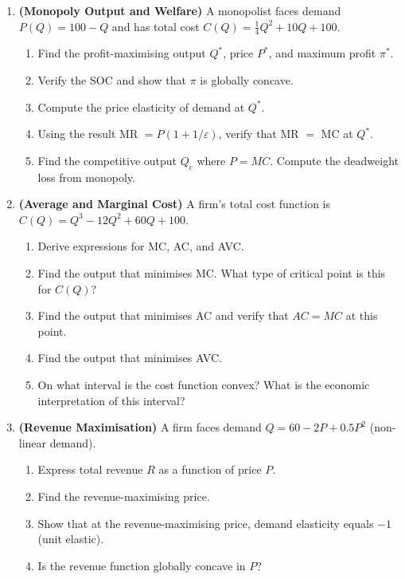 \documentclass[12pt, a4paper]{article}
\theoremstyle{definition}
\begin{document}
\begin{enumerate}[label=\textbf{B\arabic*.}, leftmargin=2.5em]

\item \textbf{(Monopoly Output and Welfare)}
A monopolist faces demand $P(Q) = 100 - Q$ and has total cost
$C(Q) = \frac{1}{4}Q^2 + 10Q + 100$.
\begin{enumerate}[label=(\alph*)]
  \item Find the profit-maximising output $Q^*$, price $P^*$, and
        maximum profit $\pi^*$.
  \item Verify the SOC and show that $\pi$ is globally concave.
  \item Compute the price elasticity of demand at $Q^*$.
  \item Using the result MR $= P(1+1/\varepsilon)$, verify that
        MR $=$ MC at $Q^*$.
  \item Find the competitive output $Q_c$ where $P = MC$.
        Compute the deadweight loss from monopoly.
\end{enumerate}

\item \textbf{(Average and Marginal Cost)}
A firm's total cost function is $C(Q) = Q^3 - 12Q^2 + 60Q + 100$.
\begin{enumerate}[label=(\alph*)]
  \item Derive expressions for MC, AC, and AVC.
  \item Find the output that minimises MC.  What type of critical point
        is this for $C(Q)$?
  \item Find the output that minimises AC and verify that $AC = MC$ at
        this point.
  \item Find the output that minimises AVC.
  \item On what interval is the cost function convex?  What is the
        economic interpretation of this interval?
\end{enumerate}

\item \textbf{(Revenue Maximisation)}
A firm faces demand $Q = 60 - 2P + 0.5P^2$ (non-linear demand).
\begin{enumerate}[label=(\alph*)]
  \item Express total revenue $R$ as a function of price $P$.
  \item Find the revenue-maximising price.
  \item Show that at the revenue-maximising price, demand elasticity
        equals $-1$ (unit elastic).
  \item Is the revenue function globally concave in $P$?
\end{enumerate}


\end{enumerate}
\end{document}
